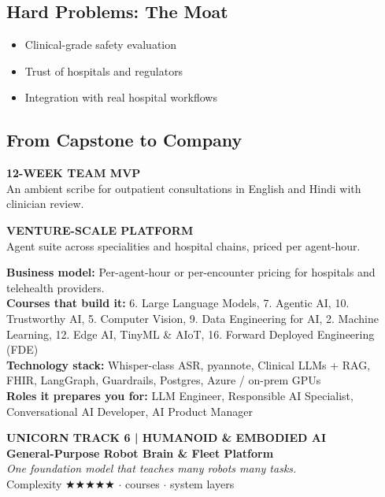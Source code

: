\documentclass[10pt,a4paper]{article}
\begin{document}
\subsection*{Hard Problems: The Moat}\begin{itemize}\small
\item Clinical-grade safety evaluation
\item Trust of hospitals and regulators
\item Integration with real hospital workflows
\end{itemize}
\subsection*{From Capstone to Company}
\begin{tcbraster}[raster columns=2,raster equal height,raster column skip=8pt]\begin{tcolorbox}[colback=l1bg,colframe=l1bg,arc=2pt,borderline north={2.5pt}{0pt}{saffron}]{\scriptsize\bfseries\color{muted}12-WEEK TEAM MVP}\\\small An ambient scribe for outpatient consultations in English and Hindi with clinician review.\end{tcolorbox}\begin{tcolorbox}[colback=l3bg,colframe=l3bg,arc=2pt,borderline north={2.5pt}{0pt}{igreen}]{\scriptsize\bfseries\color{muted}VENTURE-SCALE PLATFORM}\\\small Agent suite across specialities and hospital chains, priced per agent-hour.\end{tcolorbox}\end{tcbraster}
{\small\textbf{Business model:} Per-agent-hour or per-encounter pricing for hospitals and telehealth providers.\\\textbf{Courses that build it:} 6. Large Language Models, 7. Agentic AI, 10. Trustworthy AI, 5. Computer Vision, 9. Data Engineering for AI, 2. Machine Learning, 12. Edge AI, TinyML \& AIoT, 16. Forward Deployed Engineering (FDE)\\\textbf{Technology stack:} Whisper-class ASR, pyannote, Clinical LLMs + RAG, FHIR, LangGraph, Guardrails, Postgres, Azure / on-prem GPUs\\\textbf{Roles it prepares you for:} LLM Engineer, Responsible AI Specialist, Conversational AI Developer, AI Product Manager}
\newpage
\begin{tcolorbox}[colback=navy,colframe=navy,arc=2pt,left=8pt,top=5pt,bottom=5pt]{\small\bfseries\color{goldl}UNICORN TRACK 6 \;|\; HUMANOID \& EMBODIED AI}\\[1pt]{\LARGE\bfseries\color{white}General-Purpose Robot Brain \& Fleet Platform}\\[2pt]{\small\itshape\color{goldl}One foundation model that teaches many robots many tasks.}\\[2pt]{\small\color{white}Complexity {\color{goldl}★★★★★} \;$\cdot$ courses \;$\cdot$ system layers}\end{tcolorbox}
\end{document}
